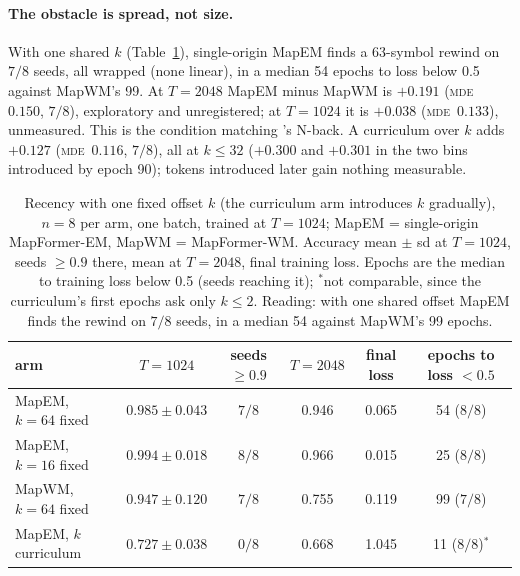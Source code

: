 \documentclass[10pt]{article}
\newcommand{\mde}{\textsc{mde}}
\begin{document}
\paragraph{The obstacle is spread, not size.} With one shared $k$ (Table~\ref{tab:fixedk}), single-origin
MapEM finds a 63-symbol rewind on $7/8$ seeds, all wrapped (none linear), in a median 54 epochs to loss
below 0.5 against MapWM's 99. At $T=2048$ MapEM minus MapWM is $+0.191$ (\mde\ $0.150$, $7/8$), exploratory
and unregistered; at $T=1024$ it is $+0.038$ (\mde\ $0.133$), unmeasured. This is the condition matching
\citet{whittington2025tale}'s N-back. A curriculum over $k$ adds $+0.127$ (\mde\ $0.116$, $7/8$), all at
$k\le32$ ($+0.300$ and $+0.301$ in the two bins introduced by epoch 90); tokens introduced later gain
nothing measurable. %

\begin{table}[t]
\centering
\small
\captionsetup{font=footnotesize,skip=4pt}
\caption{Recency with one fixed offset $k$ (the curriculum arm introduces $k$ gradually), $n=8$ per arm, one batch, trained at $T=1024$; MapEM = single-origin MapFormer-EM, MapWM = MapFormer-WM. Accuracy mean $\pm$ sd at $T=1024$, seeds $\ge0.9$ there, mean at $T=2048$, final training loss. Epochs are the median to training loss below 0.5 (seeds reaching it); $^{*}$not comparable, since the curriculum's first epochs ask only $k\le2$. Reading: with one shared offset MapEM finds the rewind on $7/8$ seeds, in a median 54 against MapWM's 99 epochs.}
\label{tab:fixedk}
\begin{tabular}{@{}lccccc@{}}
\toprule
arm & $T=1024$ & seeds $\ge0.9$ & $T=2048$ & final loss & epochs to loss $<0.5$ \\
\midrule
MapEM, $k=64$ fixed & $0.985\pm0.043$ & $7/8$ & 0.946 & 0.065 & 54 ($8/8$) \\
MapEM, $k=16$ fixed & $0.994\pm0.018$ & $8/8$ & 0.966 & 0.015 & 25 ($8/8$) \\
MapWM, $k=64$ fixed & $0.947\pm0.120$ & $7/8$ & 0.755 & 0.119 & 99 ($7/8$) \\
MapEM, $k$ curriculum & $0.727\pm0.038$ & $0/8$ & 0.668 & 1.045 & 11 ($8/8$)$^{*}$ \\
\bottomrule
\end{tabular}
\end{table}
\end{document}
